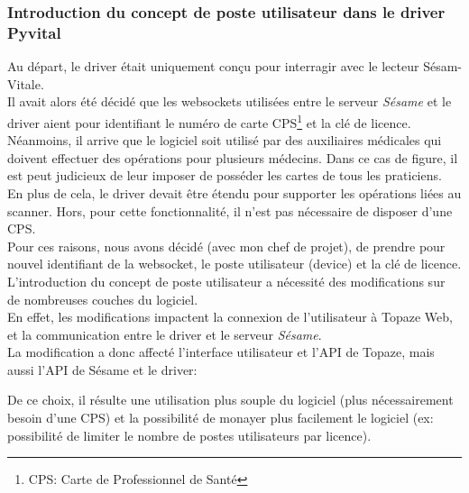 		
\subsubsection{Introduction du concept de poste utilisateur dans le driver Pyvital}

Au départ, le driver était uniquement conçu pour interragir avec le lecteur Sésam-Vitale.\\ Il avait alors été décidé que les websockets utilisées entre le serveur \textit{Sésame} et le driver aient pour identifiant le numéro de carte CPS\footnote{CPS: Carte de Professionnel de Santé} et la clé de licence.\\
Néanmoins, il arrive que le logiciel soit utilisé par des auxiliaires médicales qui doivent effectuer des opérations pour plusieurs médecins. Dans ce cas de figure, il est peut judicieux de leur imposer de posséder les cartes de tous les praticiens. \\
En plus de cela, le driver devait être étendu pour supporter les opérations liées au scanner. Hors, pour cette fonctionnalité, il n'est pas nécessaire de disposer d'une CPS.\\
Pour ces raisons, nous avons décidé (avec mon chef de projet), de prendre pour nouvel identifiant de la websocket, le poste utilisateur (device) et la clé de licence. \\

L'introduction du concept de poste utilisateur a nécessité des modifications sur de nombreuses couches du logiciel.\\
En effet, les modifications impactent la connexion de l'utilisateur à Topaze Web, et la communication entre le driver et le     
serveur \textit{Sésame}. \\
La modification a donc affecté l'interface utilisateur et l'API de Topaze, mais aussi l'API de Sésame et le driver:



De ce choix, il résulte une utilisation plus souple du logiciel (plus nécessairement besoin d'une CPS) et la possibilité de monayer plus facilement le logiciel (ex: possibilité de limiter le nombre de postes utilisateurs par licence).


